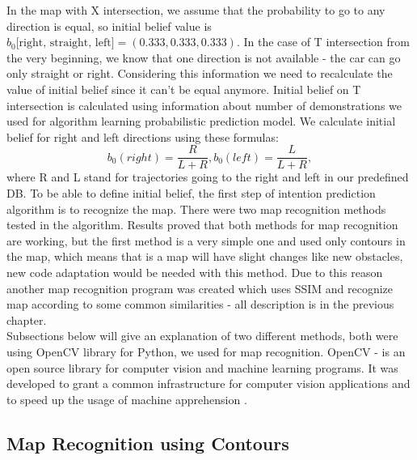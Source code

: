 In the map with X intersection, we assume that the probability to go to any direction is equal, so initial belief value is $b_0 \text{[right, straight, left]} = (0.333, 0.333, 0.333)$. In the case of T intersection from the very beginning, we know that one direction is not available - the car can go only straight or right. Considering this information we need to recalculate the value of initial belief since it can't be equal anymore. Initial belief on T intersection is calculated using information about number of demonstrations we used for algorithm learning probabilistic prediction model. We calculate initial belief for right and left directions using these formulas:
\begin{equation}
b_{0}(right) = \frac{R}{L + R}, b_{0}(left) = \frac{L}{L + R},
\end{equation}
where R and L stand for trajectories going to the right and left in our predefined \gls{DB}.
To be able to define initial belief, the first step of intention prediction algorithm is to recognize the map. There were two map recognition methods tested in the algorithm. Results proved that both methods for map recognition are working, but the first method is a very simple one and used only contours in the map, which means that is a map will have slight changes like new obstacles, new code adaptation would be needed with this method. Due to this reason another map recognition program was created which uses \gls{SSIM} and recognize map according to some common similarities - all description is in the previous chapter. \\
Subsections below will give an explanation of two different methods, both were using \gls{OpenCV} library for Python, we used for map recognition. \gls{OpenCV} - is an open source library for computer vision and machine learning programs. It was developed to grant a common infrastructure for computer vision applications and to speed up the usage of machine apprehension \cite{aboutOpenCV}. 

\subsection{Map Recognition using Contours}

